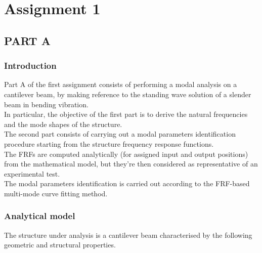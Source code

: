 \documentclass[20pt]{report}
\begin{document}
\newpage
\thispagestyle{empty} %
\mbox{} %
\newpage

\tableofcontents
\thispagestyle{empty}

\newpage



\part*{Assignment 1}


\newpage

\chapter*{PART A}

\setcounter{page}{2}
\pagestyle{plain}

\renewcommand{\thesection}{\arabic{section}} %


\section{Introduction}
Part A of the first assignment consists of performing a modal analysis on a cantilever beam, by making reference to the standing wave solution of a slender beam in bending vibration.\\
In particular, the objective of the first part is to derive the natural frequencies and the mode shapes of the structure.\\ 
The second part consists of carrying out a modal parameters identification procedure starting from the structure frequency response functions.\\
The FRFs are computed analytically (for assigned input and output positions) from the mathematical model, but they're then considered as representative of an experimental test.\\
The modal parameters identification is carried out according to the FRF-based multi-mode curve fitting method.\\

\section{Analytical model}
The structure under analysis is a cantilever beam characterised by the following geometric and structural properties.
\end{document}
